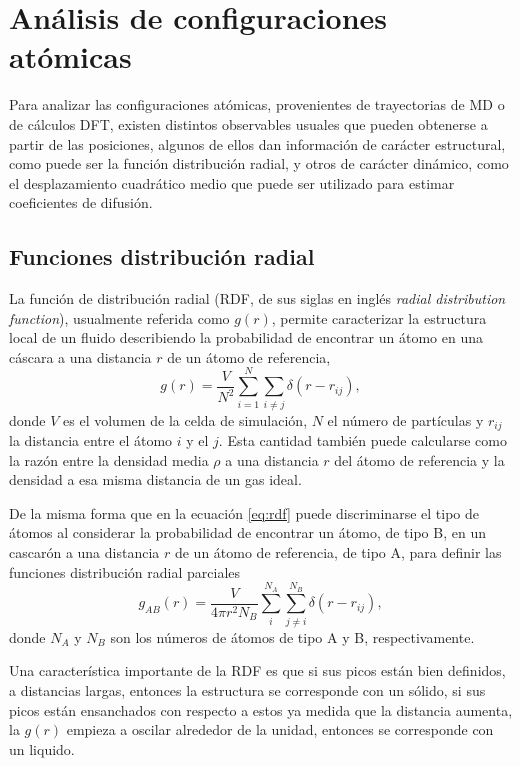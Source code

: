 \section{Análisis de configuraciones atómicas}\label{s:observables}

Para analizar las configuraciones atómicas, provenientes de trayectorias de MD
o de cálculos DFT, existen distintos observables usuales que pueden obtenerse
a partir de las posiciones, algunos de ellos dan información de carácter 
estructural, como puede ser la función distribución radial, y otros de carácter 
dinámico, como el desplazamiento cuadrático medio que puede ser utilizado para 
estimar coeficientes de difusión.

\subsection{Funciones distribución radial}

La función de distribución radial (RDF, de sus siglas en inglés \textit{radial 
distribution function}), usualmente referida como $g(r)$, permite caracterizar la
estructura local de un fluido describiendo la probabilidad de encontrar un átomo
en una cáscara a una distancia $r$ de un átomo de referencia,
\begin{equation}\label{eq:rdf}
    g(r) = \frac{V}{N^2} \sum_{i=1}^N \sum_{i \neq j} \delta(r - r_{ij}),
\end{equation}
donde $V$ es el volumen de la celda de simulación, $N$ el número de partículas y 
$r_{ij}$ la distancia entre el átomo $i$ y el $j$. Esta cantidad también puede 
calcularse como la razón entre la densidad media $\rho$ a una distancia $r$ del 
átomo de referencia y la densidad a esa misma distancia de un gas ideal.

De la misma forma que en la ecuación \ref{eq:rdf} puede discriminarse el tipo 
de átomos al considerar la probabilidad de encontrar un átomo, de tipo B, en un 
cascarón a una distancia $r$ de un átomo de referencia, de tipo A, para definir 
las funciones distribución radial parciales
\begin{equation}\label{eq:prdf}
    g_{AB}(r) = \frac{V}{4 \pi r^2 N_B} \sum_{i}^{N_A} \sum_{j\neq i}^{N_B} \delta(r - r_{ij}),
\end{equation}
donde $N_A$ y $N_B$ son los números de átomos de tipo A y B, respectivamente. 

Una característica importante de la RDF es que si sus picos están bien definidos,
a distancias largas, entonces la estructura se corresponde con un sólido, si sus 
picos están ensanchados con respecto a estos ya medida que la distancia aumenta, 
la $g(r)$ empieza a oscilar alrededor de la unidad, entonces se corresponde con 
un liquido.


